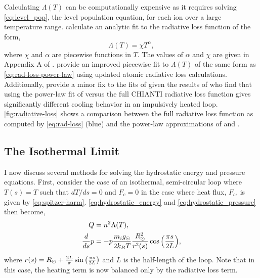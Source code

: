 Calculating $\Lambda(T)$ can be computationally expensive as it requires solving \autoref{eq:level_pop}, the level population equation, for each ion over a large temperature range. \citet{rosner_dynamics_1978} calculate an analytic fit to the radiative loss function of the form,
\begin{equation}\label{eq:rad-loss-power-law}
    \Lambda(T) = \chi T^\alpha,
\end{equation}
where $\chi$ and $\alpha$ are piecewise functions in $T$. The values of $\alpha$ and $\chi$ are given in Appendix A of \citet{rosner_dynamics_1978}. \citet{klimchuk_highly_2008} provide an improved piecewise fit to $\Lambda(T)$ of the same form as \autoref{eq:rad-loss-power-law} using updated atomic radiative loss calculations. Additionally, \citet{cargill_active_2014} provide a minor fix to the fits of \citet{klimchuk_highly_2008} given the results of \citet{reale_role_2012} who find that using the power-law fit of \citet{rosner_dynamics_1978} versus the full CHIANTI radiative loss function gives significantly different cooling behavior in an impulsively heated loop. \autoref{fig:radiative-loss} shows a comparison between the full radiative loss function as computed by \autoref{eq:rad-loss} (blue) and the power-law approximations of \citet[orange]{klimchuk_highly_2008} and \citet[green]{rosner_dynamics_1978}. 

\subsection{The Isothermal Limit}\label{sec:isothermal}

I now discuss several methods for solving the hydrostatic energy and pressure equations. First, consider the case of an isothermal, semi-circular loop where $T(s)=T$ such that $dT/ds=0$ and $F_c=0$ in the case where heat flux, $F_c$, is given by \autoref{eq:spitzer-harm}. \autoref{eq:hydrostatic_energy} and \autoref{eq:hydrostatic_pressure} then become,
\begin{align}
Q &= n^2\Lambda(T), \\
\frac{d}{ds}p &= -p\frac{m_ig_\odot}{2k_BT}\frac{R_\odot^2}{r^2(s)}\cos{\left(\frac{\pi s}{2L}\right)},
\end{align}
where $r(s) = R_\odot + \frac{2L}{\pi}\sin{\left(\frac{\pi s}{2L}\right)}$ and $L$ is the half-length of the loop. Note that in this case, the heating term is now balanced only by the radiative loss term. 

